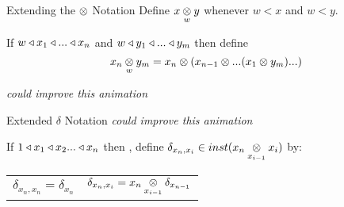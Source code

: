 \newcommand{\inningsCrossSide}{\crossx{innings\kern-0.3cm}{\kern-0.3cm side}{match}}
\newcommand{\inningsCrossPlayer}{\crossx{innings\kern-0.3cm}{\kern-0.3cm player}{match}}
\newcommand{\fieldingSidePlayer}{fieldingSide ^* (\inningsCrossPlayer)}
\newcommand{\battingSidePlayer}{battingSide ^* (\inningsCrossPlayer)}
\newcommand{\overCrossFieldingSidePlayer}{\crossx{over\kern-0.4cm}{\kern-0.4cm(\fieldingSidePlayer)}{innings}}
\newcommand{\deliveryCrossBattingSidePlayer}{\crossx{delivery\kern-0.4cm}{\kern-0.4cm (\battingSidePlayer)}{innings}}

\begin{frame}{Extending the $\crossx{}{}{}$ Notation}
Define $\crossx{x}{y}{w}$ whenever $w < x$ and $w<y$.

If $w \base x_1 \base ... \base x_n $
and $w \base y_1 \base ... \base y_m$ then define 
$$\crossx{x_n}{y_m}{w}=x_n \cross ( x_{n-1} \cross ... (x_1 \cross y_m)...)$$

\textit{\Large could improve this animation}
\pause
\begin{center}

\end{center}
\end{frame}

\begin{frame}{Extended $\delta$ Notation}
\textit{\Large could improve this animation}

If $1 \base x_1 \base x_2 ... \base x_n$
then \foreachi, define 
$\delta_{x_n,x_i} \in inst(\crossx{x_n}{x_i}{x_{i-1}})$ by:
\begin{tabular}{c c}
$\delta_{x_n,x_n}=\delta_{x_n}$ & $\delta_{x_n,x_i}=\crossx{x_n}{\delta_{x_{n-1}}}{x_{i-1}}$
\end{tabular}
\begin{center}

\end{center}
\end{frame}

